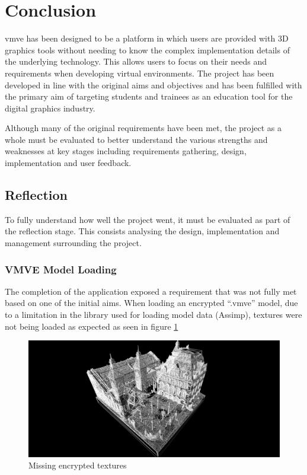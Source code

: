 \documentclass[11pt]{article}
\begin{document}
\clearpage
\section{Conclusion} \label{conclusion}

\gls*{vmve} has been designed to be a platform in which users are provided with
3D graphics tools without needing to know the complex implementation details of
the underlying technology. This allows users to focus on their needs and
requirements when developing virtual environments. The project has been
developed in line with the original aims and objectives and has been fulfilled
with the primary aim of targeting students and trainees as an education tool for
the digital graphics industry.

Although many of the original requirements have been met, the project as a whole
must be evaluated to better understand the various strengths and weaknesses at
key stages including requirements gathering, design, implementation and user
feedback.

\subsection{Reflection}
To fully understand how well the project went, it must be evaluated as part of
the reflection stage. This consists analysing the design, implementation and 
management surrounding the project.


\subsubsection{VMVE Model Loading}
The completion of the application exposed a requirement that was not fully met
based on one of the initial aims. When loading an encrypted ``.vmve'' model, due
to a limitation in the library used for loading model data (Assimp), textures
were not being loaded as expected as seen in figure \ref{fig:missing_textures}

\begin{figure}[H]
  \centering
  \includegraphics[width=\textwidth]{images/missing_textures.png}
  \caption{Missing encrypted textures}
  \label{fig:missing_textures}
\end{figure}
\end{document}

